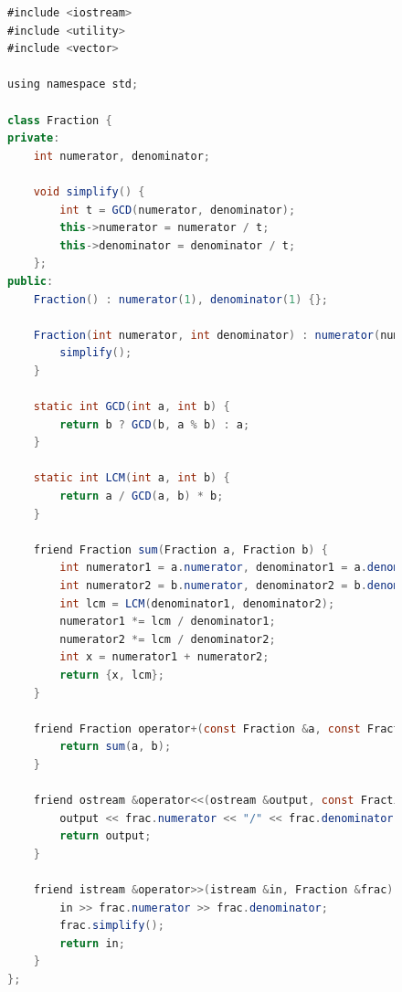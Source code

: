 \documentclass[a4paper, 14pt]{extarticle}
\begin{document}
\begin{figure}[!htb]
\begin{lstlisting}[language=Java,caption={Код класса Fraction},label={lst:fraction}]
#include <iostream>
#include <utility>
#include <vector>

using namespace std;

class Fraction {
private:
    int numerator, denominator;

    void simplify() {
        int t = GCD(numerator, denominator);
        this->numerator = numerator / t;
        this->denominator = denominator / t;
    };
public:
    Fraction() : numerator(1), denominator(1) {};

    Fraction(int numerator, int denominator) : numerator(numerator), denominator(denominator) {
        simplify();
    }

    static int GCD(int a, int b) {
        return b ? GCD(b, a % b) : a;
    }

    static int LCM(int a, int b) {
        return a / GCD(a, b) * b;
    }

    friend Fraction sum(Fraction a, Fraction b) {
        int numerator1 = a.numerator, denominator1 = a.denominator;
        int numerator2 = b.numerator, denominator2 = b.denominator;
        int lcm = LCM(denominator1, denominator2);
        numerator1 *= lcm / denominator1;
        numerator2 *= lcm / denominator2;
        int x = numerator1 + numerator2;
        return {x, lcm};
    }

    friend Fraction operator+(const Fraction &a, const Fraction &b) {
        return sum(a, b);
    }

    friend ostream &operator<<(ostream &output, const Fraction &frac) {
        output << frac.numerator << "/" << frac.denominator;
        return output;
    }

    friend istream &operator>>(istream &in, Fraction &frac) {
        in >> frac.numerator >> frac.denominator;
        frac.simplify();
        return in;
    }
};
\end{lstlisting}
\end{figure}
\end{document}

